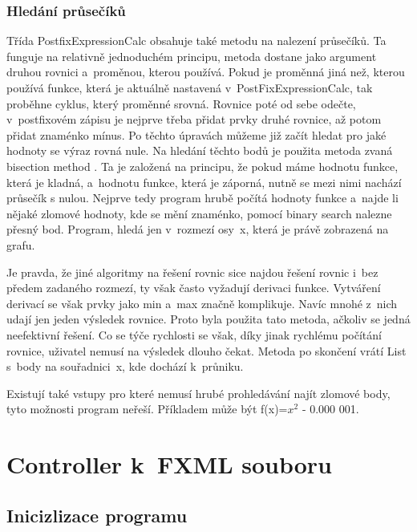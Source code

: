 \documentclass[a4paper,oneside,12p]{report}
\begin{document}
\subsubsection{Hledání průsečíků}

Třída PostfixExpressionCalc obsahuje také metodu na nalezení průsečíků.
Ta funguje na relativně jednoduchém principu, metoda dostane jako argument druhou rovnici a~proměnou, kterou používá.
Pokud je proměnná jiná než, kterou používá funkce, která je aktuálně nastavená v~PostFixExpressionCalc, tak proběhne cyklus, který proměnné srovná.
Rovnice poté od sebe odečte, v~postfixovém zápisu je nejprve třeba přidat prvky druhé rovnice, až potom přidat znaménko mínus.
Po těchto úpravách můžeme již začít hledat pro jaké hodnoty se výraz rovná nule.
Na hledání těchto bodů je použita metoda zvaná bisection method \cite{Bisection-method}.
Ta je založená na principu, že pokud máme hodnotu funkce, která je kladná, a~hodnotu funkce, která je záporná, nutně se mezi nimi nachází průsečík s nulou.
Nejprve tedy program hrubě počítá hodnoty funkce a~najde li nějaké zlomové hodnoty, kde se mění znaménko, pomocí binary search nalezne přesný bod.
Program, hledá jen v~rozmezí osy~x, která je právě zobrazená na grafu.

Je pravda, že jiné algoritmy na řešení rovnic sice najdou řešení rovnic i~bez předem zadaného rozmezí, ty však často vyžadují derivaci funkce.
Vytváření derivací se však prvky jako min a~max značně komplikuje.
Navíc mnohé z~nich udají jen jeden výsledek rovnice.
Proto byla použita tato metoda, ačkoliv se jedná neefektivní řešení.
Co se týče rychlosti se však, díky jinak rychlému počítání rovnice, uživatel nemusí na výsledek dlouho čekat.
Metoda po skončení vrátí List s~body na souřadnici~x, kde dochází k~průniku.

Existují také vstupy pro které nemusí hrubé prohledávání najít zlomové body, tyto možnosti program neřeší. Příkladem může být f(x)=$x^2$ - 0.000 001.

\section{Controller k~FXML souboru}

\subsection{Inicizlizace programu}
\end{document}
